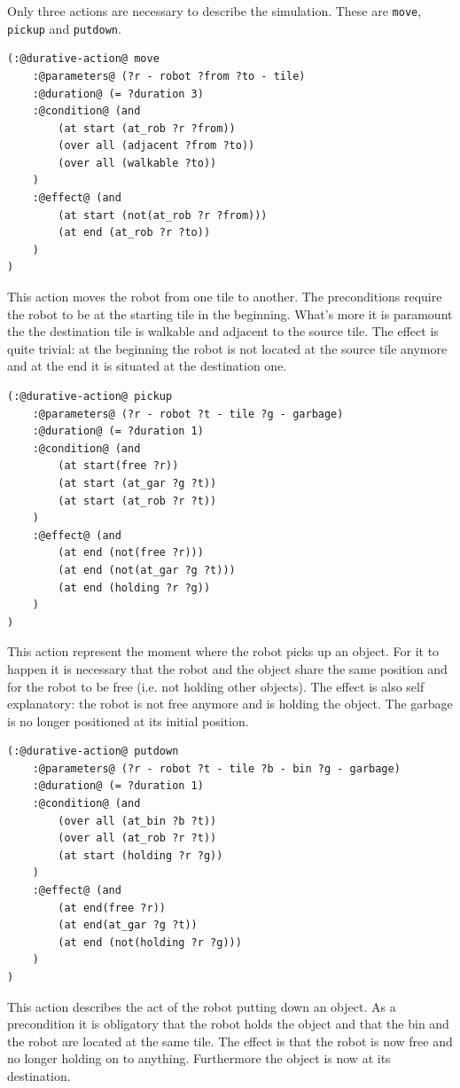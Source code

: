 Only three actions are necessary to describe the simulation. These are \texttt{move}, \texttt{pickup} and \texttt{putdown}.
\begin{lstlisting}[caption=move action definition]
(:@durative-action@ move
    :@parameters@ (?r - robot ?from ?to - tile)
    :@duration@ (= ?duration 3)
    :@condition@ (and 
        (at start (at_rob ?r ?from))
        (over all (adjacent ?from ?to))
        (over all (walkable ?to))
    )
    :@effect@ (and
        (at start (not(at_rob ?r ?from)))
        (at end (at_rob ?r ?to))
    )
)
\end{lstlisting}
This action moves the robot from one tile to another. The preconditions require the robot to be at the starting tile in the beginning. What's more it is paramount the the destination tile is walkable and adjacent to the source tile. The effect is quite trivial: at the beginning the robot is not located at the source tile anymore and at the end it is situated at the destination one.
\begin{lstlisting}[caption=pickup action definiton]
(:@durative-action@ pickup
    :@parameters@ (?r - robot ?t - tile ?g - garbage)
    :@duration@ (= ?duration 1)
    :@condition@ (and
        (at start(free ?r))
        (at start (at_gar ?g ?t))
        (at start (at_rob ?r ?t))
    )
    :@effect@ (and
        (at end (not(free ?r)))
        (at end (not(at_gar ?g ?t)))
        (at end (holding ?r ?g))
    )
)
\end{lstlisting}
This action represent the moment where the robot picks up an object. For it to happen it is necessary that the robot and the object share the same position and for the robot to be free (i.e. not holding other objects). The effect is also self explanatory: the robot is not free anymore and is holding the object. The garbage is no longer positioned at its initial position.
\begin{lstlisting}[caption=Putdown action definition]
(:@durative-action@ putdown
    :@parameters@ (?r - robot ?t - tile ?b - bin ?g - garbage)
    :@duration@ (= ?duration 1)
    :@condition@ (and
        (over all (at_bin ?b ?t))
        (over all (at_rob ?r ?t))
        (at start (holding ?r ?g))
    )
    :@effect@ (and
        (at end(free ?r))
        (at end(at_gar ?g ?t))
        (at end (not(holding ?r ?g)))
    )
)
\end{lstlisting}
This action describes the act of the robot putting down an object. As a precondition it is obligatory that the robot holds the object and that the bin and the robot are located at the same tile. The effect is that the robot is now free and no longer holding on to anything. Furthermore the object is now at its destination.
